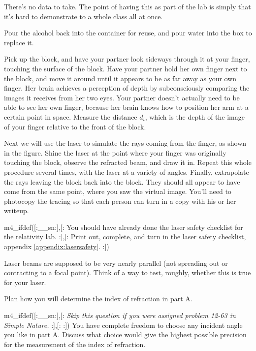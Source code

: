 There's no data
to take.
The point of having this as part of the lab is simply that
it's hard to demonstrate to a whole class all at once.


Pour the alcohol back into the container for reuse, and pour water
into the box to replace it.

Pick up the block, and have your partner look sideways
through it at your finger, touching the surface of the
block. Have your partner hold her own finger next to the
block, and move it around until it appears to be as far away
as your own finger. Her brain achieves a perception of
depth by subconsciously comparing the images it receives
from her two eyes. Your partner doesn't actually need to be
able to see her own finger, because her brain knows how to
position her arm at a certain point in space.
 Measure the distance $d_i$, which is
the depth of the image of your finger relative to the front of the block.



Next we will use the laser to simulate the rays coming from the finger,
as shown in the figure.
Shine the laser at the point
where your finger was originally touching the block, observe
the refracted beam, and draw it in. Repeat this whole
procedure several times, with the laser at a variety of
angles. Finally, extrapolate the rays leaving the block back
into the block. They should all appear to have come from the
same point, where you saw the virtual image. You'll need to
photocopy the tracing so that each person can turn in a copy
with his or her writeup.

\prelab

m4_ifdef([:__sn:],[:%
You should have already done the laser safety checklist for the relativity lab.
:],[:
Print out, complete, and turn in the laser safety checklist, appendix \ref{appendix:lasersafety}.
:])

\prelabquestion  Laser beams are supposed to be very nearly parallel (not
spreading out or contracting to a focal point). Think of a
way to test, roughly, whether this is true for your laser.

\prelabquestion  Plan how you will determine the index of refraction in part A.

\prelabquestion
m4_ifdef([:__sn:],[:%
\emph{Skip this question if you were assigned problem 12-63 in Simple Nature.}
:],[:%
:])%
 You have complete freedom to choose any incident angle you
like in part A. Discuss what choice would give the highest possible precision
for the measurement of the index of refraction.

